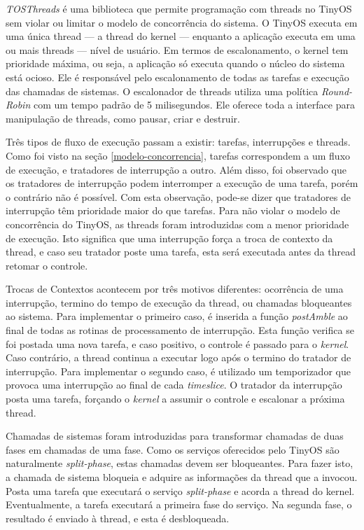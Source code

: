 \textit{TOSThreads} é uma biblioteca que permite programação com threads no TinyOS sem violar ou limitar o modelo de concorrência do
sistema. O TinyOS executa em uma única thread --- a thread do kernel --- enquanto a aplicação executa 
em uma ou mais threads --- nível de usuário.
Em termos de escalonamento, o kernel tem prioridade máxima, ou seja, a aplicação só executa quando o núcleo do sistema
está ocioso. Ele é responsável pelo escalonamento de todas as tarefas e execução das chamadas de sistemas. 
O escalonador de threads utiliza uma política \textit{Round-Robin} com um tempo padrão de 5 milisegundos. Ele oferece
toda a interface para manipulação de threads, como pausar, criar e destruir. 

Três tipos de fluxo de execução passam a existir: tarefas, interrupções e threads. Como foi visto na seção
\ref{modelo-concorrencia}, tarefas correspondem a um fluxo de execução, e tratadores de interrupção a outro. Além
disso, foi observado que os tratadores de interrupção podem interromper a execução de uma tarefa, porém o contrário não
é possível.
Com esta observação, pode-se dizer que tratadores de interrupção têm prioridade maior do que tarefas.
Para não violar o modelo de concorrência do TinyOS, as threads foram introduzidas com a menor prioridade de execução.
Isto significa que uma interrupção força a troca de contexto da thread, e caso seu tratador poste uma tarefa, esta
será executada antes da thread retomar o controle.

Trocas de Contextos
acontecem por três motivos diferentes: ocorrência de uma interrupção, termino do tempo de execução da thread, ou chamadas
bloqueantes ao sistema. 
Para implementar o primeiro caso, é inserida a função \textit{postAmble} ao final de todas as rotinas de processamento
de interrupção. Esta função verifica se foi postada uma nova tarefa, e caso positivo, o controle é passado para o
\textit{kernel}. Caso contrário, a thread continua a executar logo após o termino do tratador de interrupção.
Para implementar o segundo caso, é utilizado um temporizador que provoca uma interrupção ao final de cada
\textit{timeslice}. O tratador da interrupção posta uma tarefa, forçando o \textit{kernel} a assumir o controle e 
escalonar a próxima thread.

Chamadas de sistemas foram introduzidas para transformar chamadas de duas fases em chamadas de uma fase. Como os
serviços oferecidos pelo TinyOS são naturalmente \textit{split-phase}, estas chamadas devem ser bloqueantes.
Para fazer isto, a chamada de sistema bloqueia e adquire as informações da thread que a invocou. Posta uma tarefa que
executará o serviço \textit{split-phase} e acorda a thread do kernel. Eventualmente, a tarefa executará a primeira fase
do serviço. Na segunda fase, o resultado é enviado à thread, e esta é desbloqueada.

